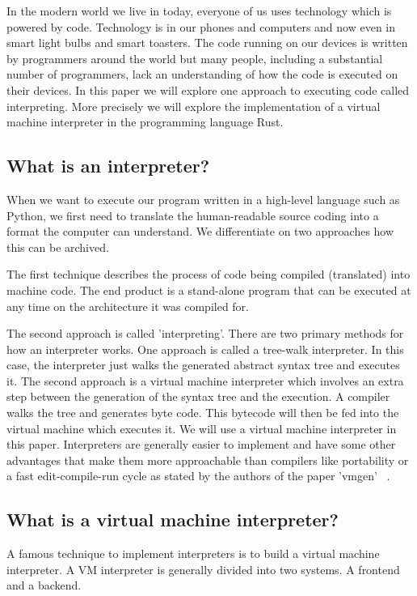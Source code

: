 \documentclass{article}
\begin{document}

In the modern world we live in today, everyone of us uses technology which
is powered by code. Technology is in our phones and computers and now even
in smart light bulbs and smart toasters. The code running on our devices
is written by programmers around the world but many people, including a
substantial number of programmers, lack an understanding of how the code is
executed on their devices.
In this paper we will explore one approach to executing code called
interpreting. More precisely we will explore the implementation of a
virtual machine interpreter in the programming language Rust.

\subsection{What is an interpreter?}
When we want to execute our program written in a high-level language such as
Python, we first need to translate the human-readable source coding into a
format the computer can understand. We differentiate on two approaches how this
can be archived.

The first technique describes the process of code being compiled (translated)
into machine code. The end product is a stand-alone program that can be
executed at any time on the architecture it was compiled for.

The second approach is called 'interpreting'. There are two primary methods for
how an interpreter works. One approach is called a tree-walk interpreter. In
this case, the interpreter just walks the generated abstract syntax tree and
executes it. The second approach is a virtual machine interpreter which
involves an extra step between the generation of the syntax tree and the
execution. A compiler walks the tree and generates byte code. This bytecode
will then be fed into the virtual machine which executes it. We will use a
virtual machine interpreter in this paper. Interpreters are generally easier to
implement and have some other advantages that make them more approachable than
compilers like portability or a fast edit-compile-run cycle as stated by the
authors of the paper 'vmgen' ~\cite{vmgen}. 

\subsection{What is a virtual machine interpreter?}
A famous technique to implement interpreters is to build a virtual machine
interpreter. A VM interpreter is generally divided into two systems. A frontend
and a backend. ~\cite{vmgen}
\end{document}
